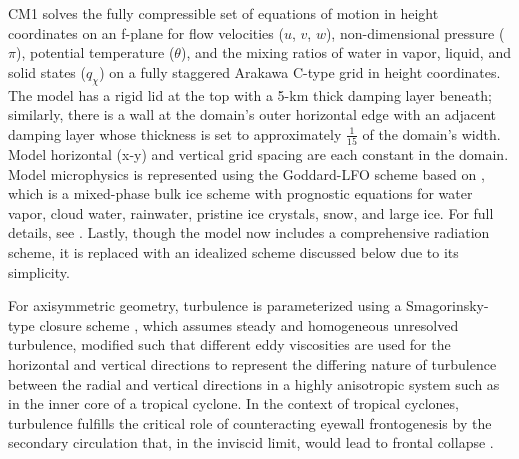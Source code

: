 \documentclass[12pt]{article}
\begin{document}
CM1 solves the fully compressible set of equations of motion in height coordinates on an f-plane for flow velocities ($u$, $v$, $w$), non-dimensional pressure ($\pi$), potential temperature ($\theta$), and the mixing ratios of water in vapor, liquid, and solid states ($q_\chi$) on a fully staggered Arakawa C-type grid in height coordinates. The model has a rigid lid at the top with a 5-km thick damping layer beneath; similarly, there is a wall at the domain's outer horizontal edge with an adjacent damping layer whose thickness is set to approximately $\frac{1}{15}$ of the domain's width.  Model horizontal (x-y) and vertical grid spacing are each constant in the domain. Model microphysics is represented using the Goddard-LFO scheme based on \cite{Lin_Farley_Orville_1983}, which is a mixed-phase bulk ice scheme with prognostic equations for water vapor, cloud water, rainwater, pristine ice crystals, snow, and large ice. For full details, see \cite{Bryan_Fritsch_2002}. Lastly, though the model now includes a comprehensive radiation scheme, it is replaced with an idealized scheme discussed below due to its simplicity.

For axisymmetric geometry, turbulence is parameterized using a Smagorinsky-type closure scheme \citep{Smagorinsky_1963}, which assumes steady and homogeneous unresolved turbulence, modified such that different eddy viscosities are used for the horizontal and vertical directions to represent the differing nature of turbulence between the radial and vertical directions in a highly anisotropic system such as in the inner core of a tropical cyclone.  In the context of tropical cyclones, turbulence fulfills the critical role of counteracting eyewall frontogenesis by the secondary circulation that, in the inviscid limit, would lead to frontal collapse \citep{Emanuel_1997}.
\end{document}
